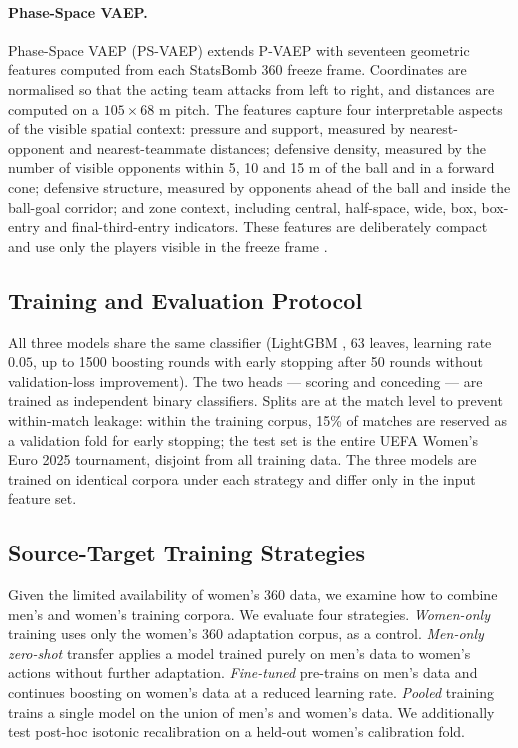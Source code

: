 \documentclass[runningheads]{llncs}
\begin{document}
\paragraph{\textbf{Phase-Space VAEP.}}
\label{sec:spatial}
Phase-Space VAEP (PS-VAEP) extends P-VAEP with seventeen geometric features computed from each StatsBomb 360 freeze frame. Coordinates are normalised so that the acting team attacks from left to right, and distances are computed on a $105 \times 68$ m pitch. The features capture four interpretable aspects of the visible spatial context: pressure and support, measured by nearest-opponent and nearest-teammate distances; defensive density, measured by the number of visible opponents within 5, 10 and 15 m of the ball and in a forward cone; defensive structure, measured by opponents ahead of the ball and inside the ball-goal corridor; and zone context, including central, half-space, wide, box, box-entry and final-third-entry indicators. These features are deliberately compact and use only the players visible in the freeze frame \cite{statsbomb2021freezeframe}.
\subsection{Training and Evaluation Protocol}
All three models share the same classifier (LightGBM \cite{ke2017lightgbm}, 63 leaves, learning rate $0.05$, up to 1500 boosting rounds with early stopping after 50 rounds without validation-loss improvement). The two heads --- scoring and conceding --- are trained as independent binary classifiers. Splits are at the match level to prevent within-match leakage: within the training corpus, 15\% of matches are reserved as a validation fold for early stopping; the test set is the entire UEFA Women's Euro 2025 tournament, disjoint from all training data. The three models are trained on identical corpora under each strategy and differ only in the input feature set.
\subsection{Source-Target Training Strategies}
Given the limited availability of women's 360 data, we examine how to combine men's and women's training corpora. We evaluate four strategies. \emph{Women-only} training uses only the women's 360 adaptation corpus, as a control. \emph{Men-only zero-shot} transfer applies a model trained purely on men's data to women's actions without further adaptation. \emph{Fine-tuned} pre-trains on men's data and continues boosting on women's data at a reduced learning rate. \emph{Pooled} training trains a single model on the union of men's and women's data. We additionally test post-hoc isotonic recalibration on a held-out women's calibration fold.
\end{document}
